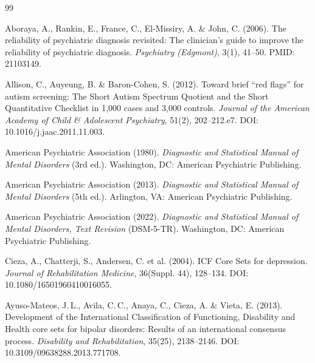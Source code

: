 \documentclass[11pt,a4paper]{article}
\begin{document}
\newpage
\begin{thebibliography}{99}

Aboraya, A., Rankin, E., France, C., El-Missiry, A. \& John, C. (2006).
\newblock The reliability of psychiatric diagnosis revisited: The clinician's guide to improve the reliability of psychiatric diagnosis.
\newblock \textit{Psychiatry (Edgmont)}, 3(1), 41--50. PMID: 21103149.

Allison, C., Auyeung, B. \& Baron-Cohen, S. (2012).
\newblock Toward brief ``red flags'' for autism screening: The Short Autism Spectrum Quotient and the Short Quantitative Checklist in 1,000 cases and 3,000 controls.
\newblock \textit{Journal of the American Academy of Child \& Adolescent Psychiatry}, 51(2), 202--212.e7. DOI: 10.1016/j.jaac.2011.11.003.

American Psychiatric Association (1980).
\newblock \textit{Diagnostic and Statistical Manual of Mental Disorders} (3rd ed.).
\newblock Washington, DC: American Psychiatric Publishing.

American Psychiatric Association (2013).
\newblock \textit{Diagnostic and Statistical Manual of Mental Disorders} (5th ed.).
\newblock Arlington, VA: American Psychiatric Publishing.

American Psychiatric Association (2022).
\newblock \textit{Diagnostic and Statistical Manual of Mental Disorders, Text Revision} (DSM-5-TR).
\newblock Washington, DC: American Psychiatric Publishing.

Cieza, A., Chatterji, S., Andersen, C. et al. (2004).
\newblock ICF Core Sets for depression.
\newblock \textit{Journal of Rehabilitation Medicine}, 36(Suppl. 44), 128--134. DOI: 10.1080/16501960410016055.

Ayuso-Mateos, J.\,L., Avila, C.\,C., Anaya, C., Cieza, A. \& Vieta, E. (2013).
\newblock Development of the International Classification of Functioning, Disability and Health core sets for bipolar disorders: Results of an international consensus process.
\newblock \textit{Disability and Rehabilitation}, 35(25), 2138--2146. DOI: 10.3109/09638288.2013.771708.


\end{thebibliography}
\end{document}
